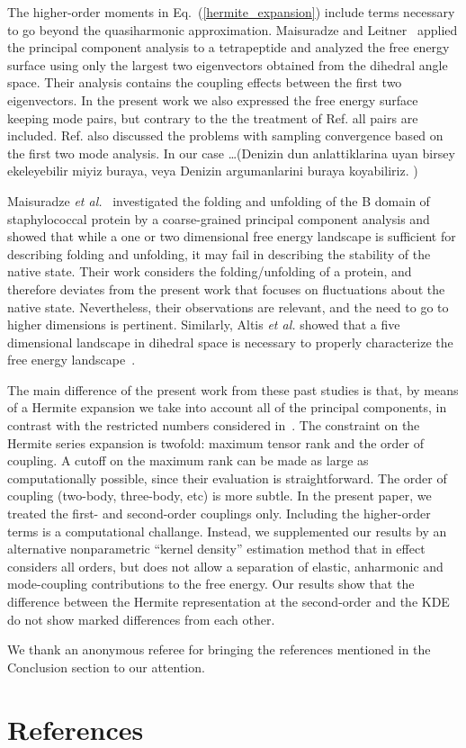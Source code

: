 \documentclass[12pt,article]{iopart}
\begin{document}
The higher-order moments in Eq.~(\ref{hermite_expansion}) include
terms necessary to go beyond the quasiharmonic
approximation. Maisuradze and Leitner~\cite{maisuradze2007free}
applied the principal component analysis to a tetrapeptide and
analyzed the free energy surface using only the largest two
eigenvectors obtained from the dihedral angle space. Their analysis
contains the coupling effects between the first two eigenvectors. In
the present work we also expressed the free energy surface keeping
mode pairs, but contrary to the the treatment of
Ref.\cite{maisuradze2007free} all pairs are
included. Ref.\cite{maisuradze2007free} also discussed the problems
with sampling convergence based on the first two mode analysis. In our
case …(Denizin dun anlattiklarina uyan birsey ekeleyebilir miyiz
buraya, veya Denizin argumanlarini buraya koyabiliriz. )

Maisuradze {\it et al.}~\cite{maisuradze2009adequate} investigated the
folding and unfolding of the B domain of staphylococcal protein by a
coarse-grained principal component analysis and showed that while a
one or two dimensional free energy landscape is sufficient for
describing folding and unfolding, it may fail in describing the
stability of the native state. Their work considers the
folding/unfolding of a protein, and therefore deviates from the
present work that focuses on fluctuations about the native
state. Nevertheless, their observations are relevant, and the need to
go to higher dimensions is pertinent. Similarly, Altis {\it et al.}
showed that a five dimensional landscape in dihedral space is
necessary to properly characterize the free energy
landscape~\cite{altis2008construction}.

The main difference of the present work from these past studies is
that, by means of a Hermite expansion we take into account all of the
principal components, in contrast with the restricted numbers
considered
in~\cite{maisuradze2007free,maisuradze2009adequate,altis2008construction}. The
constraint on the Hermite series expansion is twofold: maximum tensor
rank and the order of coupling. A cutoff on the maximum rank can be
made as large as computationally possible, since their evaluation is
straightforward. The order of coupling (two-body, three-body, etc) is
more subtle. In the present paper, we treated the first- and
second-order couplings only. Including the higher-order terms is a
computational challange. Instead, we supplemented our results by an
alternative nonparametric ``kernel density'' estimation method that in
effect considers all orders, but does not allow a separation of
elastic, anharmonic and mode-coupling contributions to the free
energy. Our results show that the difference between the Hermite
representation at the second-order and the KDE do not show marked
differences from each other.


We thank an anonymous referee for bringing the references mentioned in
the Conclusion section to our attention.

\section*{References}


\end{document}
